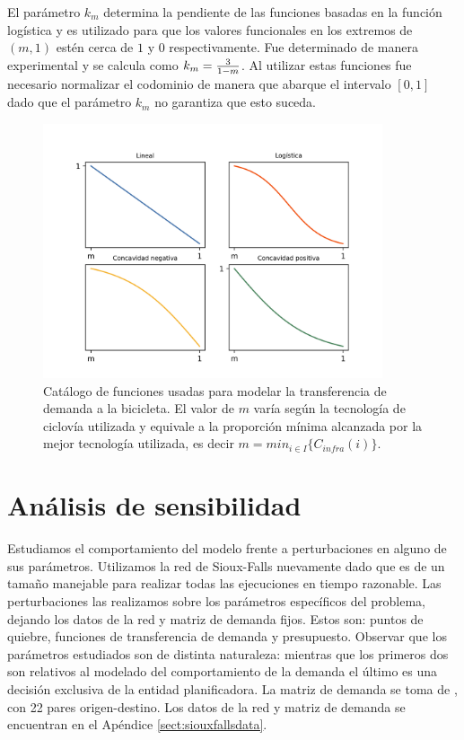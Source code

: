 El parámetro $k_m$ determina la pendiente de las funciones basadas en la función logística y es utilizado para que los valores funcionales en los extremos de $(m, 1)$ estén cerca de $1$ y $0$ respectivamente. Fue determinado de manera experimental y se calcula como $k_m = {3 \over 1 - m}$. Al utilizar estas funciones fue necesario normalizar el codominio de manera que abarque el intervalo $[0, 1]$ dado que el parámetro $k_m$ no garantiza que esto suceda.

\begin{figure}[h!]
  \centering
  \includegraphics[width=10cm]{../resources/f_catalog.png}
    \caption{Catálogo de funciones usadas para modelar la transferencia de demanda a la bicicleta. El valor de $m$ varía según la tecnología de ciclovía utilizada y equivale a la proporción mínima alcanzada por la mejor tecnología utilizada, es decir $m = min_{i \in I} \{ C_{infra}(i) \}$.}
  \label{fig:fcatalog}
\end{figure}

\section{Análisis de sensibilidad}

Estudiamos el comportamiento del modelo frente a perturbaciones en alguno de sus parámetros. Utilizamos la red de Sioux-Falls nuevamente dado que es de un tamaño manejable para realizar todas las ejecuciones en tiempo razonable. Las perturbaciones las realizamos sobre los parámetros específicos del problema, dejando los datos de la red y matriz de demanda fijos. Estos son: puntos de quiebre, funciones de transferencia de demanda y presupuesto. Observar que los parámetros estudiados son de distinta naturaleza: mientras que los primeros dos son relativos al modelado del comportamiento de la demanda el último es una decisión exclusiva de la entidad planificadora. La matriz de demanda se toma de \cite{Liu2019}, con 22 pares origen-destino. Los datos de la red y matriz de demanda se encuentran en el Apéndice \ref{sect:siouxfallsdata}.


